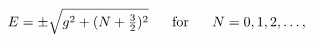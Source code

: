 \begin{equation}
\nonumber
 E = \pm \sqrt{g^2 + (N+\tfrac{3}{2})^2}~~~~~{\rm for}~~~~~
N = 0,1,2,\dots,
\end{equation}

